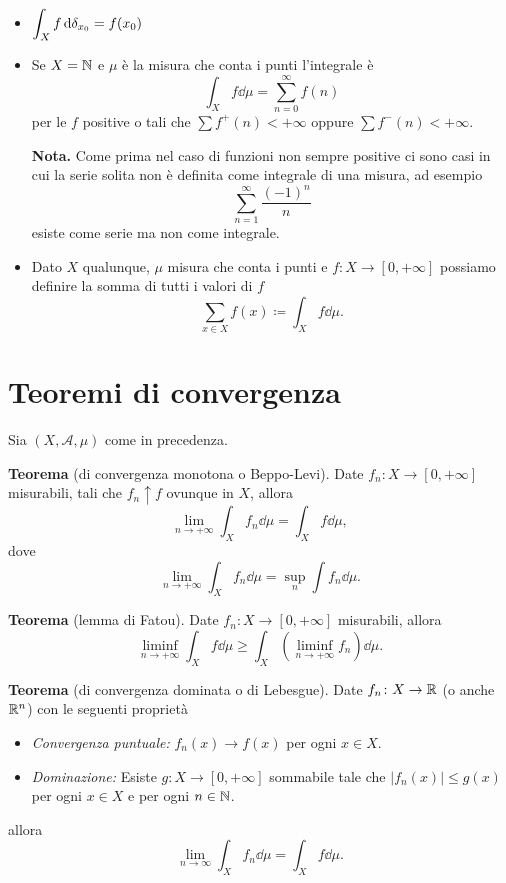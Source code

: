 \documentclass[a4paper, 12pt]{report}
\begin{document}
\begin{itemize}
	\item $\displaystyle \int_X f \,\mathrm{d} \delta_{x_0} = f(x_0)$
	
	\item Se $X = \mathbb N$ e $\mu$ è la misura che conta i punti l'integrale è 
		$$
		\int_X f \dd \mu = \sum_{n = 0}^{\infty} f(n) 
		$$ 
		per le $f$ positive o tali che $\sum f^+(n) < +\infty $ oppure $\sum f^-(n) < +\infty $.
		
		\textbf{Nota.} Come prima nel caso di funzioni non sempre positive ci sono casi in cui la serie solita non è definita come integrale di una misura, ad esempio
		$$
		\sum_{n=1}^{\infty} \frac{(-1)^n}{n}
		$$
		esiste come serie ma non come integrale.
		
	\item Dato $X$ qualunque, $\mu$ misura che conta i punti e $f \colon  X \to [0,+\infty] $ possiamo definire la somma di tutti i valori di $f$ 
		$$
		\sum_{x \in X} f(x) \coloneqq \int_{X} f \dd \mu.  
		$$ 
\end{itemize}

\section{Teoremi di convergenza}

Sia $(X, \mathcal{A}, \mu)$ come in precedenza.

\textbf{Teorema} (di convergenza monotona o Beppo-Levi).
Date $f_n \colon  X \to [0,+\infty]$ misurabili, tali che $f_n \uparrow f$ ovunque in $X$, allora
$$
\lim_{n \to +\infty} \int_{X} f_n \dd \mu = \int_X f \dd \mu,
$$
dove
$$
\lim_{n \to +\infty} \int_{X} f_n \dd \mu = \sup_n \int f_n \dd \mu.
$$


\textbf{Teorema} (lemma di Fatou).
Date $f_n \colon X \to [0,+\infty]$ misurabili, allora
$$
\liminf_{n \to +\infty} \int_X f \dd \mu \geq \int_{X} \left( \liminf_{n \to +\infty} f_n \right) \dd \mu.
$$ 

\textbf{Teorema} (di convergenza dominata o di Lebesgue).
Date $f_n \colon  X \to \mathbb R$ (o anche $\mathbb R^n$) con le seguenti proprietà
\begin{itemize}
	\item \textit{Convergenza puntuale:} $f_n (x) \to f(x)$ per ogni $x \in X$.
	\item \textit{Dominazione:} Esiste $g \colon X \to [0,+\infty]$ sommabile tale che $\left| f_n (x) \right| \leq g(x)$ per ogni $x \in X$ e per ogni $n \in \mathbb N$.
\end{itemize}
allora
$$
\lim_{n \to \infty} \int_{X} f_n \dd \mu = \int_X f \dd \mu. 
$$ 
\end{document}
